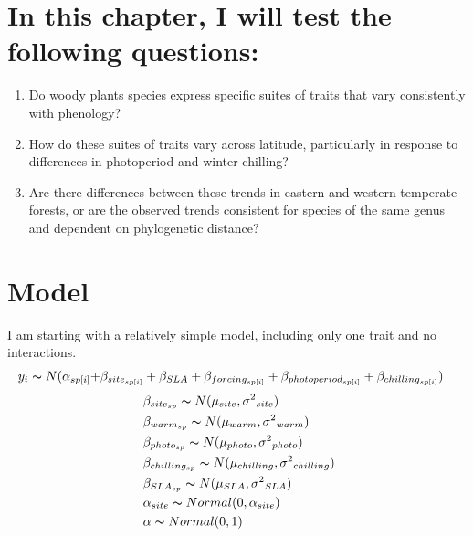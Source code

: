 \documentclass{article}\usepackage[]{graphicx}\usepackage[]{color}
\begin{document}
\section*{In this chapter, I will test the following questions:}
\begin{enumerate}
\item Do woody plants species express specific suites of traits that vary consistently with phenology? 
\item How do these suites of traits vary across latitude, particularly in response to differences in photoperiod and winter chilling?
\item Are there differences between these trends in eastern and western temperate forests, or are the observed trends consistent for species of the same genus and dependent on phylogenetic distance?

\end{enumerate}
\par %

\section*{Model}

I am starting with a relatively simple model, including only one trait and no interactions. 
\begin{align*}
y_i \thicksim N(\alpha_{sp[i]} +& \beta_{site_{sp[i]}} + \beta_{SLA}+ \beta_{forcing_{sp[i]}} + \beta_{photoperiod_{sp[i]}} + \beta_{chilling_{sp[i]}})
\end{align*}
\begin{align*}
& \; \beta_{site_{sp}} \thicksim N(\mu_{site}, \sigma{^2}_{site}) \\
& \; \beta_{warm_{sp}} \thicksim N(\mu_{warm}, \sigma{^2}_{warm}) \\
& \; \beta_{photo_{sp}} \thicksim N(\mu_{photo}, \sigma{^2}_{photo}) \\
& \; \beta_{chilling_{sp}} \thicksim N(\mu_{chilling}, \sigma{^2}_{chilling}) \\
& \; \beta_{SLA_{sp}} \thicksim N(\mu_{SLA}, \sigma{^2}_{SLA}) \\
& \; \alpha_{site} \thicksim Normal (0,\alpha_{site})\\
& \; \alpha \thicksim Normal (0,1)\\
\end{align*}
\end{document}
